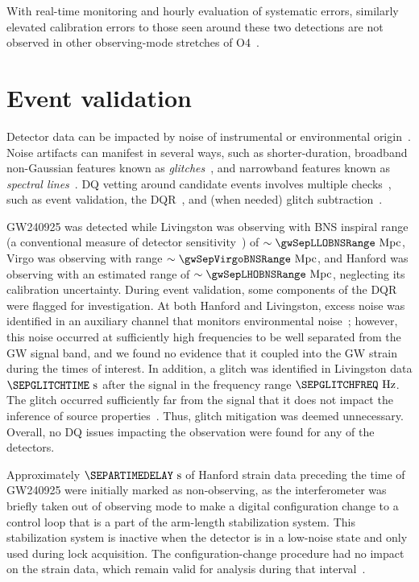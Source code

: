 With real-time monitoring and hourly evaluation of systematic errors, similarly elevated calibration errors to those seen around these two detections are not observed in other observing-mode stretches of \ac{O4}~\cite{O4Unc}.

\section{Event validation}

Detector data can be impacted by noise of instrumental or environmental origin~\cite{Soni:2020rbu,Glanzer:2023hzf,Soni:2023kqq}.
Noise artifacts can manifest in several ways, such as shorter-duration, broadband non-Gaussian features known as \emph{glitches}~\cite{Nuttall:2018xhi,Glanzer:2022avx}, and narrowband features known as \emph{spectral lines}~\cite{LSC:2018vzm}.
\Ac{DQ} vetting around candidate events involves multiple checks~\cite{Soni:2024kkz}, such as event validation, the \ac{DQR}~\cite{Davis:2021ecd,Virgo:2022kwz}, and (when needed) glitch subtraction~\cite{Vajente:2019ycy,Hourihane:2022doe,Davis:2022ird}.

\ac{GW240925} was detected while Livingston was observing with \acl{BNS} inspiral range (a conventional measure of detector sensitivity~\cite{Allen:2005fk,Chen:2017wpg,LIGOScientific:2025hdt}) of $\sim\gwSepLLOBNSRange~\mathrm{Mpc}$, Virgo was observing with range $\sim\gwSepVirgoBNSRange~\mathrm{Mpc}$, and Hanford was observing with an estimated range of $\sim\gwSepLHOBNSRange~\mathrm{Mpc}$, neglecting its calibration uncertainty.
During event validation, some components of the \ac{DQR} were flagged for investigation.
At both Hanford and Livingston, excess noise was identified in an auxiliary channel that monitors environmental noise~\cite{Helmling-Cornell:2023wqe}; however, this noise occurred at sufficiently high frequencies to be well separated from the \ac{GW} signal band, and we found no evidence that it coupled into the \ac{GW} strain during the times of interest.
In addition, a glitch was identified in Livingston data $\SEPGLITCHTIME~\mathrm{s}$ after the signal in the frequency range $\SEPGLITCHFREQ~\mathrm{Hz}$.
The glitch occurred sufficiently far from the signal that it does not impact the inference of source properties~\cite{Hourihane:2025vxc}.
Thus, glitch mitigation was deemed unnecessary.
Overall, no \ac{DQ} issues impacting the observation were found for any of the detectors.

Approximately $\SEPARTIMEDELAY~\mathrm{s}$ of Hanford strain data preceding the time of \ac{GW240925} were initially marked as non-observing, as the interferometer was briefly taken out of observing mode to make a digital configuration change to a control loop that is a part of the arm-length stabilization system.
This stabilization system is inactive when the detector is in a low-noise state and only used during lock acquisition.
The configuration-change procedure had no impact on the strain data, which remain valid for analysis during that interval~\cite{Betzwieser:2025aaa}.

